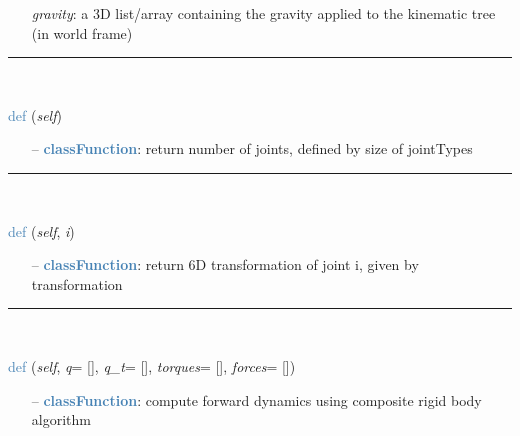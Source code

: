 \begin{itemize}[leftmargin=1.4cm]
\begin{itemize}[leftmargin=1.4cm]
\begin{itemize}[leftmargin=0.5cm]
\begin{itemize}[leftmargin=1.4cm]
\begin{itemize}[leftmargin=1.4cm]
\begin{itemize}[leftmargin=0.5cm]
\begin{itemize}[leftmargin=1.4cm]
\begin{itemize}[leftmargin=0.5cm]
\begin{itemize}[leftmargin=1.4cm]
\begin{itemize}[leftmargin=1.4cm]
\begin{itemize}[leftmargin=1.4cm]
\begin{itemize}[leftmargin=0.7cm]
\begin{itemize}[leftmargin=1.2cm]
\item[]{\it gravity}: a 3D list/array containing the gravity applied to the kinematic tree (in world frame)
\end{itemize}
\vspace{12pt}\end{itemize}
%
\noindent\rule{8cm}{0.75pt}\vspace{1pt} \\ 
\begin{flushleft}
\noindent \textcolor{steelblue}{def {\bf {}}}\label{sec:kinematicTree:KinematicTree66:Size}
({\it self})
\end{flushleft}
\setlength{\itemindent}{0.7cm}
\begin{itemize}[leftmargin=0.7cm]
\item[--]\textcolor{steelblue}{\bf classFunction}: return number of joints, defined by size of jointTypes
\vspace{12pt}\end{itemize}
%
\noindent\rule{8cm}{0.75pt}\vspace{1pt} \\ 
\begin{flushleft}
\noindent \textcolor{steelblue}{def {\bf {}}}\label{sec:kinematicTree:KinematicTree66:XL}
({\it self}, {\it i})
\end{flushleft}
\setlength{\itemindent}{0.7cm}
\begin{itemize}[leftmargin=0.7cm]
\item[--]\textcolor{steelblue}{\bf classFunction}: return 6D transformation of joint i, given by transformation
\vspace{12pt}\end{itemize}
%
\noindent\rule{8cm}{0.75pt}\vspace{1pt} \\ 
\begin{flushleft}
\noindent \textcolor{steelblue}{def {\bf {}}}\label{sec:kinematicTree:KinematicTree66:ForwardDynamicsCRB}
({\it self}, {\it q}= [], {\it q\_t}= [], {\it torques}= [], {\it forces}= [])
\end{flushleft}
\setlength{\itemindent}{0.7cm}
\begin{itemize}[leftmargin=0.7cm]
\item[--]\textcolor{steelblue}{\bf classFunction}: compute forward dynamics using composite rigid body algorithm

\end{itemize}
\end{itemize}
\end{itemize}
\end{itemize}
\end{itemize}
\end{itemize}
\end{itemize}
\end{itemize}
\end{itemize}
\end{itemize}
\end{itemize}
\end{itemize}
